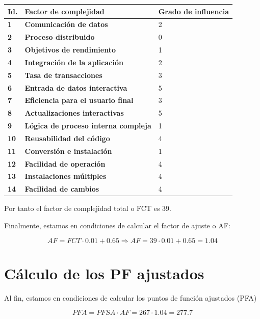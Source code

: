 \documentclass[spanish,a4paper,11pt, twoside]{report}	%
\begin{document}
		\begin{tabular}{|p{1cm}||p{8cm}||p{4cm}|}
			\hline
			\textbf{Id.} & \textbf{Factor de complejidad} & \textbf{Grado de influencia} \\ \hline \hline
			\textbf{1} & \textbf{Comunicación de datos} & 2 \\ \hline 
			\textbf{2} & \textbf{Proceso distribuido} & 0 \\ \hline 
			\textbf{3} & \textbf{Objetivos de rendimiento} & 1 \\ \hline 
			\textbf{4} & \textbf{Integración de la aplicación} & 2 \\ \hline 
			\textbf{5} & \textbf{Tasa de transacciones} & 3 \\ \hline 
			\textbf{6} & \textbf{Entrada de datos interactiva} & 5 \\ \hline 
			\textbf{7} & \textbf{Eficiencia para el usuario final} & 3 \\ \hline 
			\textbf{8} & \textbf{Actualizaciones interactivas} & 5 \\ \hline 
			\textbf{9} & \textbf{Lógica de proceso interna compleja} & 1 \\ \hline 
			\textbf{10} & \textbf{Reusabilidad del código} & 4 \\ \hline 
			\textbf{11} & \textbf{Conversión e instalación} & 1 \\ \hline 
			\textbf{12} & \textbf{Facilidad de operación} & 4 \\ \hline 
			\textbf{13} & \textbf{Instalaciones múltiples} & 4 \\ \hline 
			\textbf{14} & \textbf{Facilidad de cambios} & 4 \\ \hline 
		\end{tabular}
\vspace{0.35cm}

	Por tanto el factor de complejidad total o FCT es 39.

	Finalmente, estamos en condiciones de calcular el factor de ajuste o AF:
	
	$$AF = FCT \cdot 0.01 + 0.65 \Rightarrow AF = 39 \cdot 0.01 + 0.65 = 1.04$$

\section{Cálculo de los PF ajustados}
	Al fin, estamos en condiciones de calcular los puntos de función ajustados (PFA)

	$$ \boxed{PFA = PFSA \cdot AF = 267 \cdot 1.04 = 277.7}$$
\end{document}
